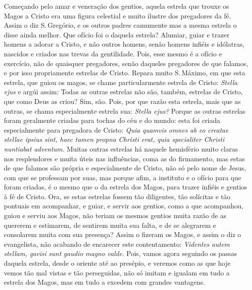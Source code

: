 Começando pelo amar e veneração dos gentios, aquela estrela que trouxe
os Magos a Cristo era uma figura celestial e muito ilustre dos
pregadores da fé. Assim o diz S.\,Gregório, e os outros padres camumente
mas a mesma estrela o disse ainda melhor. Que ofício foi o daquela
estrela? Alumiar, guiar e trazer homens a adorar a Cristo, e não outros
homens, senão homens infiéis e idólatras, nascidos e criados nas trevas
da gentilidade. Pois, esse mesmo é a ofício e exercício, não de
quaisquer pregadores, senão daqueles pregadores de que falamos, e por
isso propriamente estrelas de Cristo. Repara muito S.\,Máximo, em que
esta estrela, que guiou os magos, se chame particularmente estrela de
Cristo: \emph{Stella ejus} e argúi assim: Todas as outras estrelas não
são, também, estrelas de Cristo, que como Deus as criou? Sim, são. Pois,
por que razão esta estrela, mais que as outras, se chama especialmente
estrela sua: \emph{Stella ejus?} Porque as outras estrelas foram
geralmente criadas para tochas do céu e do mundo: esta foi criada
especialmente para pregadora de Cristo: \emph{Quia quamvis omnes ab eo
creatae stellae ipsius sint, haec tamen propna Christi erat, quia
specialiter Christi nuntiabat adventum.} Muitas outras estrelas há naquele hemisfério muito claras nos
resplendores e muita úteis nas influências, coma as do firmamento, mas
estas de que falamos são própria e especialmente de Cristo, não só pelo
nome de Jesus, com que se professam por suas, mas porque afim, a
instituto e o ofício para que foram criadas, é o mesmo que o da estrela
dos Magos, para trazer infiéis e gentios à fé de Cristo. Ora, se estas
estrelas fossem tão diligentes, tão solícitas e tão pontuais em
acompanhar, e guiar, e servir aos gentios, como a que acompanhou, guiou
e serviu aos Magos, não teriam os mesmos gentios muita razão de as
quererem e estimarem, de sentirem muita sua falta, e de se alegrarem e
consolarem muita com sua presença? Assim o fizeram os Magos, e assim o
diz o evangelista, não acabando de encarecer este contentamento:
\emph{Videntes autem stellam, gavisi sunt gaudio magno valde}.
Pois, vamos agora seguindo os passas daquela estrela, desde
o oriente até ao presépio, e veremos como as que hoje vemos tão mal
vistas e tão perseguidas, não só imitam e igualam em tudo a estrela dos
Magos, mas em tudo a excedem com grandes vantagens.

